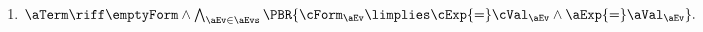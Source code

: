 \begin{scope}
\begin{multicols}{2}
\begin{enumerate}[topsep=0pt,label=(\textsc{w}\arabic*),ref=\textsc{w}\arabic*]
    \item \label {write-term-ca-addr}
      \begin{math}
        \aTerm \riff
        \emptyForm
        \land
        \bigwedge_{\aEv\in\aEvs}\PBR{\cForm_\aEv \limplies \cExp{=}\cVal_\aEv \land\aExp{=}\aVal_\aEv}.
      \end{math}
    \end{enumerate}
  \end{multicols}


\end{scope}
